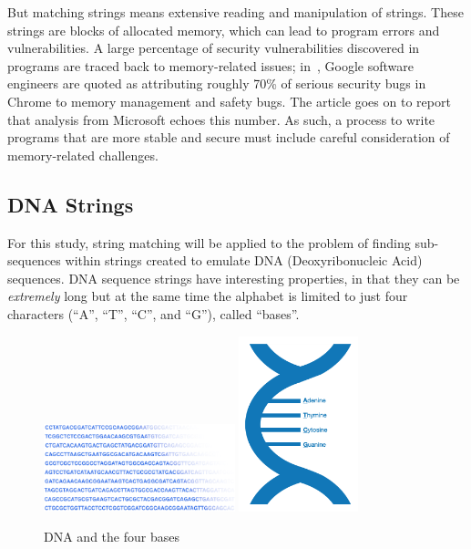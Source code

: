 But matching strings means extensive reading and manipulation of strings. These strings are blocks of allocated memory, which can lead to program errors and vulnerabilities. A large percentage of security vulnerabilities discovered in programs are traced back to memory-related issues; in~\cite{cimpanu}, Google software engineers are quoted as attributing roughly 70\% of serious security bugs in Chrome to memory management and safety bugs. The article goes on to report that analysis from Microsoft echoes this number. As such, a process to write programs that are more stable and secure must include careful consideration of memory-related challenges.

\subsection{DNA Strings}

For this study, string matching will be applied to the problem of finding sub-sequences within strings created to emulate DNA (Deoxyribonucleic Acid) sequences. DNA sequence strings have interesting properties, in that they can be \textit{extremely} long but at the same time the alphabet is limited to just four characters (``A'', ``T'', ``C'', and ``G''), called ``bases''.

\begin{figure}[ht]
    \centering
    \begin{minipage}{6in}
        \centering
        \includegraphics[align=c,height=1in]{figures/dna2.png}
        \hspace*{.2in}
        \includegraphics[align=c,height=2in]{figures/dna.png}
    \end{minipage}\hfill
    \caption{DNA and the four bases}
    \label{fig:image:dna}
\end{figure}

